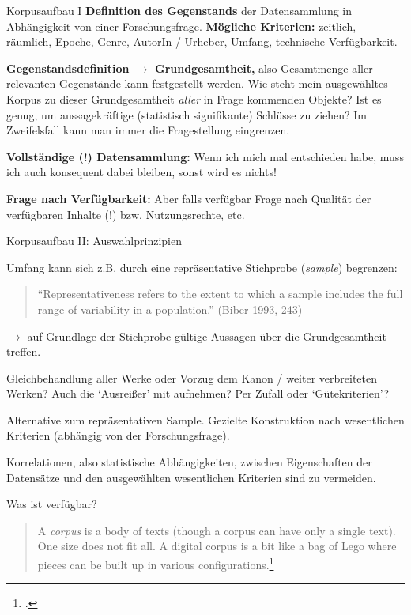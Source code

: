 \documentclass[10pt,a4paper]{article}
\begin{document}
\begin{multicols}{3}
\begin{textbox}{Korpusaufbau I}
\textbf{Definition des Gegenstands} der Datensammlung in Abhängigkeit von einer Forschungsfrage. 
\textbf{Mögliche Kriterien:} zeitlich, räumlich, Epoche, Genre, AutorIn / Urheber, Umfang, technische Verfügbarkeit.

\textbf{Gegenstandsdefinition $\to$ Grundgesamtheit,} also Gesamtmenge aller relevanten Gegenstände kann festgestellt werden. Wie steht mein ausgewähltes Korpus zu dieser Grundgesamtheit \emph{aller} in Frage kommenden Objekte? Ist es genug, um aussagekräftige (statistisch signifikante) Schlüsse zu ziehen? Im Zweifelsfall kann man immer die Fragestellung eingrenzen.

\textbf{Vollständige (!) Datensammlung:} Wenn ich mich mal entschieden habe, muss ich auch konsequent dabei bleiben, sonst wird es nichts!

\textbf{Frage nach Verfügbarkeit:} Aber falls verfügbar Frage nach Qualität der verfügbaren Inhalte (!) bzw. Nutzungsrechte, etc.

\end{textbox}



\begin{textbox}{Korpusaufbau II: Auswahlprinzipien}

Umfang kann sich z.B. durch eine repräsentative Stichprobe (\emph{sample}) begrenzen:
\begin{quote}
``Representativeness refers to the extent to which a sample includes the full range of variability in a population.'' (Biber 1993, 243)
\end{quote}
$\to$ auf Grundlage der Stichprobe gültige Aussagen über die Grundgesamtheit treffen.

Gleichbehandlung aller Werke oder Vorzug dem Kanon / weiter verbreiteten Werken? Auch die `Ausreißer' mit aufnehmen? Per Zufall oder `Gütekriterien'?

 Alternative zum repräsentativen Sample. Gezielte Konstruktion nach wesentlichen Kriterien (abhängig von der Forschungsfrage).

Korrelationen, also statistische Abhängigkeiten, zwischen Eigenschaften der Datensätze und den ausgewählten wesentlichen Kriterien sind zu vermeiden.

 Was ist verfügbar?

\begin{quote}
     A \emph{corpus} is a body of texts (though a corpus can have only a single text). \punkti One size does not fit all.
     \punkti A digital corpus is a bit like a bag of Lego where pieces can be built up in various configurations.\footcite[281--282]{textvisual}
\end{quote}



\end{textbox}
\end{multicols}
\end{document}
